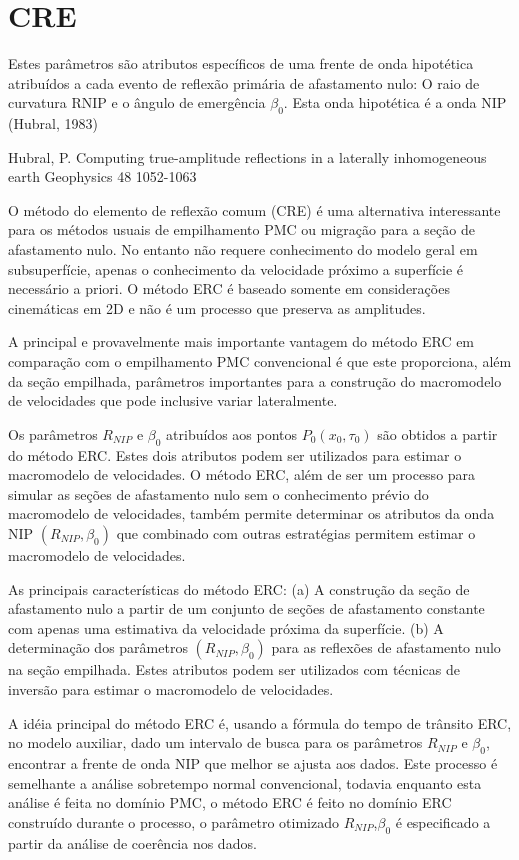 \chapter{CRE}
\label{cap4}

Estes parâmetros são atributos específicos de uma frente de onda hipotética atribuídos a cada evento de reflexão
primária de afastamento nulo: O raio de curvatura RNIP e o ângulo de emergência $\beta_0$. Esta onda hipotética é
a onda NIP (Hubral, 1983)

Hubral, P.
Computing true-amplitude reflections in a laterally inhomogeneous earth
Geophysics 48 1052-1063



O método do elemento de reflexão comum (CRE) é uma alternativa interessante para os métodos usuais de empilhamento PMC ou
migração para a seção de afastamento nulo. No entanto não requere conhecimento do modelo geral em subsuperfície, apenas
o conhecimento da velocidade próximo a superfície é necessário a priori.
O método ERC é baseado somente em considerações cinemáticas em 2D e não é
um processo que preserva as amplitudes.

A principal e provavelmente mais importante vantagem do método ERC em comparação com o empilhamento PMC convencional
é que este proporciona, além da seção empilhada, parâmetros importantes para a construção do macromodelo de 
velocidades que pode inclusive variar lateralmente.

Os parâmetros $R_{NIP}$ e $\beta_0$ atribuídos aos pontos $P_0(x_0,\tau_0)$ são obtidos a partir do método ERC.
Estes dois atributos podem ser utilizados para estimar o macromodelo de velocidades.
O método ERC, além de ser um processo para simular as seções de afastamento nulo sem o conhecimento prévio
do macromodelo de velocidades, também permite determinar os atributos da onda NIP $(R_{NIP},\beta_0)$
que combinado com outras estratégias permitem estimar o macromodelo de velocidades.

As principais características do método ERC:
(a) A construção da seção de afastamento nulo a partir de um conjunto de seções de afastamento constante
com apenas uma estimativa da velocidade próxima da superfície.
(b) A determinação dos parâmetros $(R_{NIP},\beta_0)$ para as reflexões de afastamento nulo na seção empilhada.
Estes atributos podem ser utilizados com técnicas de inversão para estimar o macromodelo de velocidades.

A idéia principal do método ERC é, usando a fórmula do tempo de trânsito ERC, no modelo auxiliar, dado um intervalo
de busca para os parâmetros $R_{NIP}$ e $\beta_0$, encontrar a frente de onda NIP que melhor se ajusta aos dados.
Este processo é semelhante a análise sobretempo normal convencional, todavia enquanto esta análise é feita no
domínio PMC, o método ERC é feito no domínio ERC construído durante o processo, o parâmetro otimizado $R_{NIP}$,$\beta_0$
é especificado a partir da análise de coerência nos dados.


